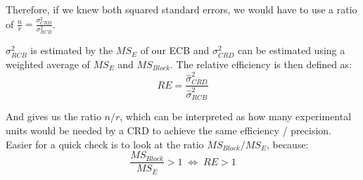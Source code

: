 Therefore, if we knew both squared standard errors, we would have to use a ratio of $\frac{n}{r} = \frac{\sigma_{CRD}^2}{\sigma_{RCB}^2}$. \medskip

$\sigma_{RCB}^2$ is estimated by the $MS_E$ of our ECB and $\sigma_{CRD}^2$ can be estimated using a weighted average of $MS_E$ and $MS_{Block}$. The relative efficiency is then defined as:
$$RE = \frac{\hat \sigma_{CRD}^2}{\hat \sigma_{RCB}^2}$$

And gives us the ratio $n / r$, which can be interpreted as how many experimental units would be needed by a CRD to achieve the same efficiency / precision. Easier for a quick check is to look at the ratio $MS_{Block} / MS_E$, because:
$$\frac{MS_{Block}}{MS_E} > 1 \; \Leftrightarrow \; RE > 1$$
